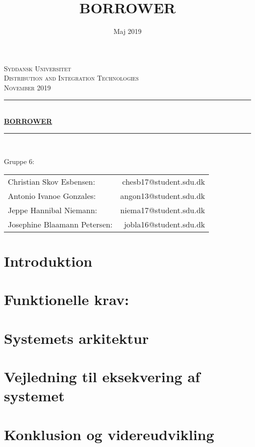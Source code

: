 \documentclass{article}
\begin{document}
\thispagestyle{empty}
\begingroup
\setlength{\columnsep}{0pt}
\endgroup

\newcommand{\hRule}{\rule{\linewidth}{0.5mm}}

\begin{center}
\textsc{\huge Syddansk Universitet}\\[0.3cm]
\textsc{\Large Distribution and Integration Technologies\\November 2019}\\[0.5cm]  
\date{Maj 2019}
\hRule \\[1cm]
{\huge \bfseries \ul{BORROWER} }\\[0.75cm] 
\hRule \\[1cm] 
\linespread{1.5}
\end{center}
\title{BORROWER}
\begin{center}
 \LARGE{Gruppe 6:}
\end{center}
\begin{center}
 \begin{tabular}{l  r}
    Christian Skov Esbensen: & chesb17@student.sdu.dk\\
    Antonio Ivanoe Gonzales: & angon13@student.sdu.dk\\
    Jeppe Hannibal Niemann: & niema17@student.sdu.dk\\
    Josephine Blaamann Petersen: & jobla16@student.sdu.dk
\end{tabular}
\end{center} 

\pagestyle{fancy}
\fancyhf{}


\newpage
\section{Introduktion}

\section{Funktionelle krav:}

\section{Systemets arkitektur}

\section{Vejledning til eksekvering af systemet}

\section{Konklusion og videreudvikling}

\end{document}
